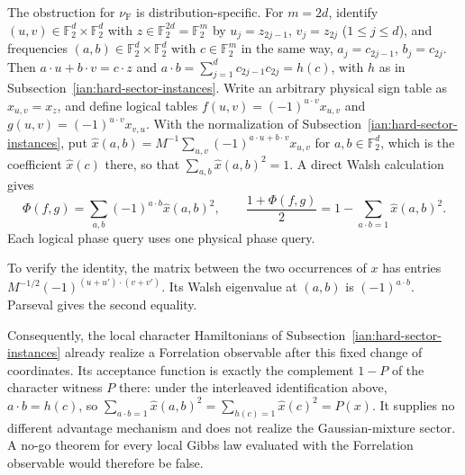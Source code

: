 \begin{remark}
\label{ian:thermal-forrelation-character-relabeling}
The obstruction for \(\nu_{\mathrm F}\) is distribution-specific.
For \(m=2d\), identify \((u,v)\in\mathbb F_2^d\times\mathbb F_2^d\)
with \(z\in\mathbb F_2^{2d}=\mathbb F_2^m\) by \(u_j=z_{2j-1}\),
\(v_j=z_{2j}\) (\(1\le j\le d\)), and frequencies
\((a,b)\in\mathbb F_2^d\times\mathbb F_2^d\) with \(c\in\mathbb F_2^m\)
in the same way, \(a_j=c_{2j-1}\), \(b_j=c_{2j}\). Then
\(a\cdot u+b\cdot v=c\cdot z\) and
\(a\cdot b=\sum_{j=1}^{d}c_{2j-1}c_{2j}=h(c)\), with \(h\) as in
Subsection~\ref{ian:hard-sector-instances}.
Write an arbitrary physical sign table as \(x_{u,v}=x_z\), and define
logical tables
\(f(u,v)=(-1)^{u\cdot v}x_{u,v}\) and
\(g(u,v)=(-1)^{u\cdot v}x_{v,u}\).
With the normalization of Subsection~\ref{ian:hard-sector-instances},
put
\(\widehat x(a,b)=M^{-1}\sum_{u,v}(-1)^{a\cdot u+b\cdot v}x_{u,v}\)
for \(a,b\in\mathbb F_2^d\), which is the coefficient \(\widehat x(c)\)
there, so that
\(\sum_{a,b}\widehat x(a,b)^2=1\).
A direct Walsh calculation gives
\[
 \Phi(f,g)
 =\sum_{a,b}(-1)^{a\cdot b}\widehat x(a,b)^2,
 \qquad
 \frac{1+\Phi(f,g)}2
 =1-\sum_{a\cdot b=1}\widehat x(a,b)^2.
 \tag{36.28}
\]
Each logical phase query uses one physical phase query.

To verify the identity, the matrix between the two occurrences of
\(x\) has entries
\(M^{-1/2}(-1)^{(u+u')\cdot(v+v')}\).
Its Walsh eigenvalue at \((a,b)\) is \((-1)^{a\cdot b}\).
Parseval gives the second equality.

Consequently, the local character Hamiltonians of
Subsection~\ref{ian:hard-sector-instances} already
realize a Forrelation observable after this fixed change of
coordinates. Its acceptance function is exactly the complement
\(1-P\) of the character witness \(P\) there: under the interleaved
identification above, \(a\cdot b=h(c)\), so
\(\sum_{a\cdot b=1}\widehat x(a,b)^2=\sum_{h(c)=1}\widehat x(c)^2=P(x)\). It supplies no different advantage
mechanism and does not realize the Gaussian-mixture sector.
A no-go theorem for every local Gibbs law evaluated with the
Forrelation observable would therefore be false.
\end{remark}

